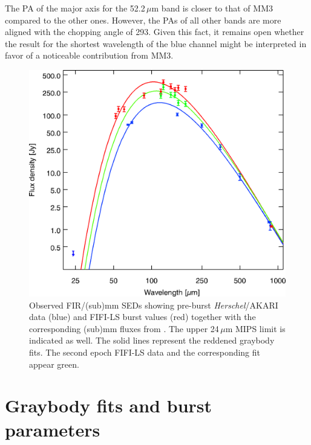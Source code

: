 The PA of the major axis for the 52.2\,$\mu$m band is closer to that of MM3 compared to the other ones. However, the PAs of all other bands 
are more aligned with the chopping angle of 293\degr{}.
Given this fact, it remains open whether the result for the shortest wavelength of the blue channel might be interpreted in favor of a noticeable contribution from MM3.



\begin{figure}   %
	\includegraphics[width=\columnwidth]{G358_FIFI-LS_HI-GAL.png}
	\caption{Observed FIR/(sub)mm SEDs showing pre-burst {\em Herschel}/AKARI data (blue) and FIFI-LS burst values (red) together with the corresponding (sub)mm fluxes from \citet{2019ApJ...881L..39B}.
	The upper 24\,$\mu$m MIPS limit
	is indicated as well. The solid lines represent the reddened graybody fits. The second epoch FIFI-LS data and the corresponding fit appear green.
	}
 \label{fig:SEDS}
\end{figure}

\section{Graybody fits and burst parameters}\label{gbp}

